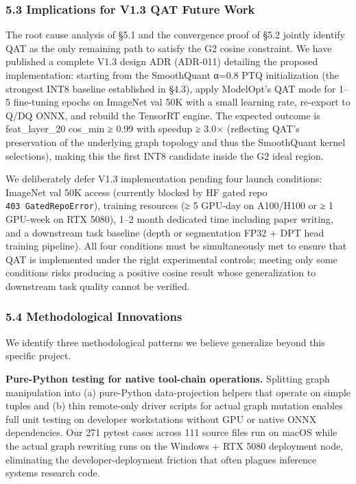 \documentclass[
]{article}
\begin{document}
\subsubsection{5.3 Implications for V1.3 QAT Future
Work}\label{implications-for-v1.3-qat-future-work}

The root cause analysis of §5.1 and the convergence proof of §5.2
jointly identify QAT as the only remaining path to satisfy the G2 cosine
constraint. We have published a complete V1.3 design ADR (ADR-011)
detailing the proposed implementation: starting from the SmoothQuant
α=0.8 PTQ initialization (the strongest INT8 baseline established in
§4.3), apply ModelOpt's QAT mode for 1--5 fine-tuning epochs on ImageNet
val 50K with a small learning rate, re-export to Q/DQ ONNX, and rebuild
the TensorRT engine. The expected outcome is feat\_layer\_20 cos\_min ≥
0.99 with speedup ≥ 3.0× (reflecting QAT's preservation of the
underlying graph topology and thus the SmoothQuant kernel selections),
making this the first INT8 candidate inside the G2 ideal region.

We deliberately defer V1.3 implementation pending four launch
conditions: ImageNet val 50K access (currently blocked by HF gated repo
\texttt{403\ GatedRepoError}), training resources (≥ 5 GPU-day on
A100/H100 or ≥ 1 GPU-week on RTX 5080), 1--2 month dedicated time
including paper writing, and a downstream task baseline (depth or
segmentation FP32 + DPT head training pipeline). All four conditions
must be simultaneously met to ensure that QAT is implemented under the
right experimental controls; meeting only some conditions risks
producing a positive cosine result whose generalization to downstream
task quality cannot be verified.

\subsubsection{5.4 Methodological
Innovations}\label{methodological-innovations}

We identify three methodological patterns we believe generalize beyond
this specific project.

\textbf{Pure-Python testing for native tool-chain operations.} Splitting
graph manipulation into (a) pure-Python data-projection helpers that
operate on simple tuples and (b) thin remote-only driver scripts for
actual graph mutation enables full unit testing on developer
workstations without GPU or native ONNX dependencies. Our 271 pytest
cases across 111 source files run on macOS while the actual graph
rewriting runs on the Windows + RTX 5080 deployment node, eliminating
the developer-deployment friction that often plagues inference systems
research code.
\end{document}
